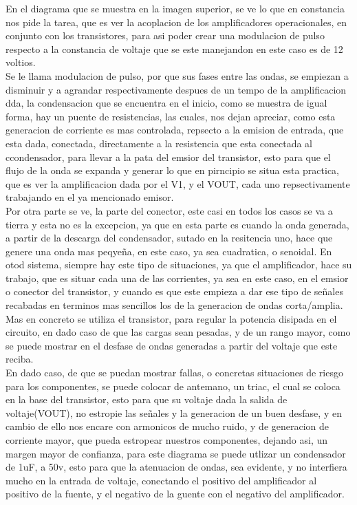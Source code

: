 \documentclass[12pt,a4paper]{article}
\begin{document}
En el diagrama que se muestra en la imagen superior, se ve lo que en constancia nos pide la tarea, que es ver la acoplacion de los amplificadores operacionales, en conjunto con los transistores, para asi poder crear una modulacion de pulso respecto a la constancia de voltaje que se este manejandon en este caso es de 12 voltios.\\

Se le llama modulacion de pulso, por que sus fases entre las ondas, se empiezan a disminuir y a agrandar respectivamente despues de un tempo de la amplificacion dda, la condensacion que se encuentra en el inicio, como se muestra de igual forma, hay un puente de resistencias, las cuales, nos dejan apreciar, como esta generacion de corriente es mas controlada, repsecto a la emision de entrada, que esta dada, conectada, directamente a la resistencia que esta conectada al ccondensador, para llevar a la pata del emsior del transistor, esto para que el flujo de la onda se expanda y generar lo que en pirncipio se situa esta practica, que es ver la amplificacion dada por el V1, y el VOUT, cada uno repsectivamente trabajando en el ya mencionado emisor.\\

Por otra parte se ve, la parte del conector, este casi en todos los casos se va a tierra y esta no es la excepcion, ya que en esta parte es cuando la onda generada, a partir de la descarga del condensador, sutado en la resitencia uno, hace que genere una onda mas peqyeña, en este caso, ya sea cuadratica, o senoidal. En otod sistema, siempre hay este tipo de situaciones, ya que el amplificador, hace su trabajo, que es situar cada una de las corrientes, ya sea en este caso, en el emsior o conector del transistor, y cuando es que este empieza a dar ese tipo de señales recabadas en terminos mas sencillos los de la generacion de ondas corta/amplia.\\

Mas en concreto se utiliza el transistor, para regular la potencia disipada en el circuito, en dado caso de que las cargas sean pesadas, y de un rango mayor, como se puede mostrar en el desfase de ondas generadas a partir del voltaje que este reciba.\\

En dado caso, de que se puedan mostrar fallas, o concretas situaciones de riesgo para los componentes, se puede colocar de antemano, un triac, el cual se coloca en la base del transistor, esto para que su voltaje dada la salida de voltaje(VOUT), no estropie las señales y la generacion de un buen desfase, y en cambio de ello nos encare con armonicos de mucho ruido, y de generacion de corriente mayor, que pueda estropear nuestros componentes, dejando asi, un margen mayor de confianza, para este diagrama se puede utlizar un condensador de 1uF, a 50v, esto para que la atenuacion de ondas, sea evidente, y no interfiera mucho en la entrada de voltaje, conectando el positivo del amplificador al positivo de la fuente, y el negativo de la guente con el negativo del amplificador.\\
\end{document}
